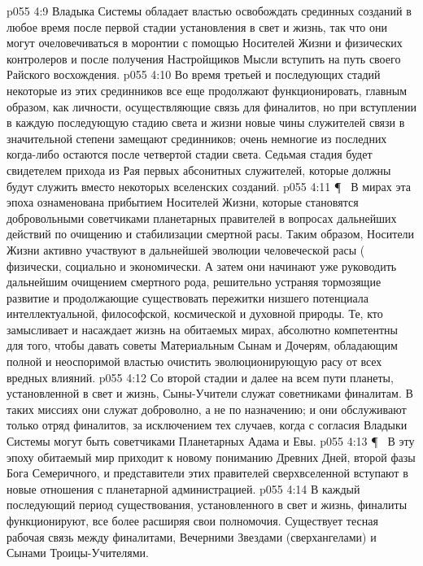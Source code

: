 \vs p055 4:9 Владыка Системы обладает властью освобождать срединных созданий в любое время после первой стадии установления в свет и жизнь, так что они могут очеловечиваться в моронтии с помощью Носителей Жизни и физических контролеров и после получения Настройщиков Мысли вступить на путь своего Райского восхождения.
\vs p055 4:10 Во время третьей и последующих стадий некоторые из этих срединников все еще продолжают функционировать, главным образом, как личности, осуществляющие связь для финалитов, но при вступлении в каждую последующую стадию света и жизни новые чины служителей связи в значительной степени замещают срединников; очень немногие из последних когда\hyp{}либо остаются после четвертой стадии света. Седьмая стадия будет свидетелем прихода из Рая первых абсонитных служителей, которые должны будут служить вместо некоторых вселенских созданий.
\vs p055 4:11 \P\ \bibnobreakspace {} В мирах эта эпоха ознаменована прибытием Носителей Жизни, которые становятся добровольными советчиками планетарных правителей в вопросах дальнейших действий по очищению и стабилизации смертной расы. Таким образом, Носители Жизни активно участвуют в дальнейшей эволюции человеческой расы ( физически, социально и экономически. А затем они начинают уже руководить дальнейшим очищением смертного рода, решительно устраняя тормозящие развитие и продолжающие существовать пережитки низшего потенциала интеллектуальной, философской, космической и духовной природы. Те, кто замысливает и насаждает жизнь на обитаемых мирах, абсолютно компетентны для того, чтобы давать советы Материальным Сынам и Дочерям, обладающим полной и неоспоримой властью очистить эволюционирующую расу от всех вредных влияний.
\vs p055 4:12 Со второй стадии и далее на всем пути планеты, установленной в свет и жизнь, Сыны\hyp{}Учители служат советниками финалитам. В таких миссиях они служат доброволно, а не по назначению; и они обслуживают только отряд финалитов, за исключением тех случаев, когда с согласия Владыки Системы могут быть советчиками Планетарных Адама и Евы.
\vs p055 4:13 \P\ \bibnobreakspace {} В эту эпоху обитаемый мир приходит к новому пониманию Древних Дней, второй фазы Бога Семеричного, и представители этих правителей сверхвселенной вступают в новые отношения с планетарной администрацией.
\vs p055 4:14 В каждый последующий период существования, установленного в свет и жизнь, финалиты функционируют, все более расширяя свои полномочия. Существует тесная рабочая связь между финалитами, Вечерними Звездами (сверхангелами) и Сынами Троицы\hyp{}Учителями.
